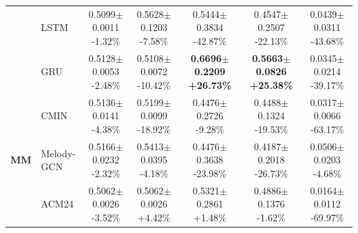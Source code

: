 \documentclass[a4paper,fleqn,doubleblind]{cas-sc}
\begin{document}
\begin{table}[!ht]
{\begin{tabular}{llccccc}
 & LSTM & \shortstack{0.5099$\pm$0.0011 \\ {\scriptsize -1.32\%}} & \shortstack{0.5628$\pm$0.1203 \\ {\scriptsize -7.58\%}} & \shortstack{0.5444$\pm$0.3834 \\ {\scriptsize -42.87\%}} & \shortstack{0.4547$\pm$0.2507 \\ {\scriptsize -22.13\%}} & \shortstack{0.0439$\pm$0.0311 \\ {\scriptsize -43.68\%}} \\
 & GRU & \shortstack{0.5128$\pm$0.0053 \\ {\scriptsize -2.48\%}} & \shortstack{0.5108$\pm$0.0072 \\ {\scriptsize -10.42\%}} & \shortstack{\textbf{0.6696}$\pm$\textbf{0.2209} \\ {\scriptsize \textbf{+26.73\%}}} & \shortstack{\textbf{0.5663}$\pm$\textbf{0.0826} \\ {\scriptsize \textbf{+25.38\%}}} & \shortstack{0.0345$\pm$0.0214 \\ {\scriptsize -39.17\%}} \\
\midrule
\multirow{4}{*}{\textbf{MM}} & CMIN & \shortstack{0.5136$\pm$0.0141 \\ {\scriptsize -4.38\%}} & \shortstack{0.5199$\pm$0.0099 \\ {\scriptsize -18.92\%}} & \shortstack{0.4476$\pm$0.2726 \\ {\scriptsize -9.28\%}} & \shortstack{0.4488$\pm$0.1324 \\ {\scriptsize -19.53\%}} & \shortstack{0.0317$\pm$0.0066 \\ {\scriptsize -63.17\%}} \\
 & Melody-GCN & \shortstack{0.5166$\pm$0.0232 \\ {\scriptsize -2.32\%}} & \shortstack{0.5413$\pm$0.0395 \\ {\scriptsize -4.18\%}} & \shortstack{0.4476$\pm$0.3638 \\ {\scriptsize -23.98\%}} & \shortstack{0.4187$\pm$0.2018 \\ {\scriptsize -26.73\%}} & \shortstack{0.0506$\pm$0.0203 \\ {\scriptsize -4.68\%}} \\
 & ACM24 & \shortstack{0.5062$\pm$0.0026 \\ {\scriptsize -3.52\%}} & \shortstack{0.5062$\pm$0.0026 \\ {\scriptsize +4.42\%}} & \shortstack{0.5321$\pm$0.2861 \\ {\scriptsize +1.48\%}} & \shortstack{0.4886$\pm$0.1376 \\ {\scriptsize -1.62\%}} & \shortstack{0.0164$\pm$0.0112 \\ {\scriptsize -69.97\%}} \\

\end{tabular}}
\end{table}
\end{document}
